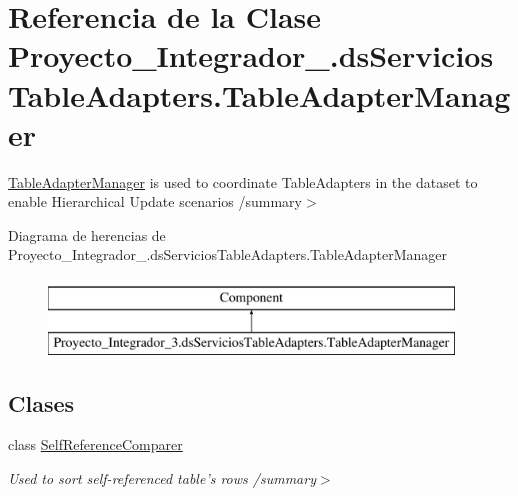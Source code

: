 \hypertarget{class_proyecto___integrador__3_1_1ds_servicios_table_adapters_1_1_table_adapter_manager}{\section{Referencia de la Clase Proyecto\-\_\-\-Integrador\-\_.\-ds\-Servicios\-Table\-Adapters.\-Table\-Adapter\-Manager}
\label{class_proyecto___integrador__3_1_1ds_servicios_table_adapters_1_1_table_adapter_manager}
}


\hyperlink{class_proyecto___integrador__3_1_1ds_servicios_table_adapters_1_1_table_adapter_manager}{Table\-Adapter\-Manager} is used to coordinate Table\-Adapters in the dataset to enable Hierarchical Update scenarios /summary$>$  


Diagrama de herencias de Proyecto\-\_\-\-Integrador\-\_.\-ds\-Servicios\-Table\-Adapters.\-Table\-Adapter\-Manager\begin{figure}[H]
\begin{center}
\leavevmode
\includegraphics[height=2.000000cm]{class_proyecto___integrador__3_1_1ds_servicios_table_adapters_1_1_table_adapter_manager}
\end{center}
\end{figure}
\subsection*{Clases}
\begin{DoxyCompactItemize}
\item 
class \hyperlink{class_proyecto___integrador__3_1_1ds_servicios_table_adapters_1_1_table_adapter_manager_1_1_self_reference_comparer}{Self\-Reference\-Comparer}
\begin{DoxyCompactList}\small\item\em Used to sort self-\/referenced table's rows /summary$>$ \end{DoxyCompactList}\end{DoxyCompactItemize}
